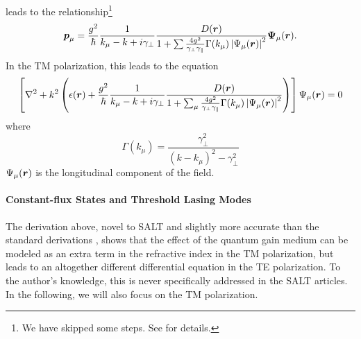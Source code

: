 leads to the relationship\footnote{We have skipped some steps. See \cite[\S2.2]{GE2010b} for details.}
  \begin{equation}
   \boldsymbol{p}_\mu = \frac{g^2}{\hbar}\frac{1}{k_\mu-k+i\gamma_\perp}\frac{D(\boldsymbol{r})}{1+\sum\frac{4g^2}{\gamma_\perp\gamma_\parallel}\Gamma(k_\mu)\left|\Psi_\mu(\boldsymbol{r})\right|^2}\boldsymbol{\Psi}_\mu(\boldsymbol{r}).
  \end{equation}
In the TM polarization, this leads to the equation
  \begin{equation}
   \left[\nabla^2+k^2\left(\epsilon(\boldsymbol{r})+\frac{g^2}{\hbar}\frac{1}{k_\mu-k+i\gamma_\perp}\frac{D(\boldsymbol{r})}{1+\sum_\mu\frac{4g^2}{\gamma_\perp\gamma_\parallel}\Gamma(k_\mu)\left|\Psi_\mu(\boldsymbol{r})\right|^2}\right)\right]\Psi_\mu(\boldsymbol{r})=0
  \end{equation}
where
	\begin{equation}
		\Gamma(k_\mu) = \frac{\gamma_\perp^2}{(k-k_\mu)^2-\gamma_\perp^2}
	\end{equation}
$\Psi_\mu(\boldsymbol{r})$ is the longitudinal component of the field. 

\paragraph{Constant-flux States and Threshold Lasing Modes}
The derivation above, novel to SALT and slightly more accurate
than the standard derivations \cite{GE2010a,GE2010b,EST2013}, shows
that the effect of the quantum gain medium can be modeled as an extra
term in the refractive index in the TM polarization, but leads to an altogether
different differential equation in the TE polarization. To the author's knowledge,
this is never specifically addressed in the SALT articles. 
In the following, we will also focus on the
TM polarization. 

